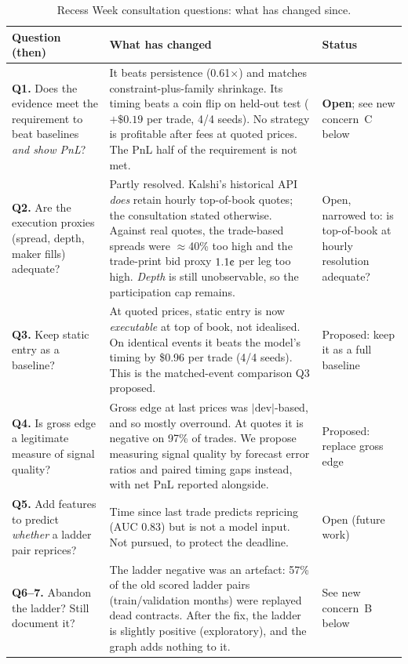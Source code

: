 \documentclass[11pt,a4paper]{article}
\newcommand{\cent}{\text{\textcent}}
\newcommand{\x}{\ensuremath{\times}}
\begin{document}
\begin{table}[h]
\centering
\small
\caption{Recess Week consultation questions: what has changed since.}
\label{tab:consult}
\begin{tabular}{p{3.6cm}p{7.6cm}p{3.0cm}}
\toprule
Question (then) & What has changed & Status \\
\midrule
\textbf{Q1.} Does the evidence meet the requirement to beat baselines
\emph{and show PnL}? &
It beats persistence (0.61\x) and matches constraint-plus-family shrinkage. Its
timing beats a coin flip on held-out test ($+\$0.19$ per trade, 4/4 seeds). No
strategy is profitable after fees at quoted prices. The PnL half of the
requirement is not met. &
\textbf{Open}; see new concern~C below \\
\addlinespace
\textbf{Q2.} Are the execution proxies (spread, depth, maker fills) adequate? &
Partly resolved. Kalshi's historical API \emph{does} retain hourly top-of-book
quotes; the consultation stated otherwise. Against real quotes, the
trade-based spreads were $\approx$40\% too high and the trade-print bid proxy
$1.1\cent$ per leg too high. \emph{Depth} is still unobservable, so the
participation cap remains. &
Open, narrowed to: is top-of-book at hourly resolution adequate? \\
\addlinespace
\textbf{Q3.} Keep static entry as a baseline? &
At quoted prices, static entry is now \emph{executable} at top of book, not
idealised. On identical events it beats the model's timing by \$0.96 per trade
(4/4 seeds). This is the matched-event comparison Q3 proposed. &
Proposed: keep it as a full baseline \\
\addlinespace
\textbf{Q4.} Is gross edge a legitimate measure of signal quality? &
Gross edge at last prices was $|\text{dev}|$-based, and so mostly overround. At
quotes it is negative on 97\% of trades. We propose measuring signal quality by
forecast error ratios and paired timing gaps instead, with net PnL reported
alongside. &
Proposed: replace gross edge \\
\addlinespace
\textbf{Q5.} Add features to predict \emph{whether} a ladder pair reprices? &
Time since last trade predicts repricing (AUC 0.83) but is not a model input.
Not pursued, to protect the deadline. &
Open (future work) \\
\addlinespace
\textbf{Q6--7.} Abandon the ladder? Still document it? &
The ladder negative was an artefact: 57\% of the old scored ladder pairs
(train/validation months) were replayed dead contracts. After the fix, the ladder is slightly positive (exploratory), and
the graph adds nothing to it. &
See new concern~B below \\
\bottomrule
\end{tabular}
\end{table}
\end{document}
